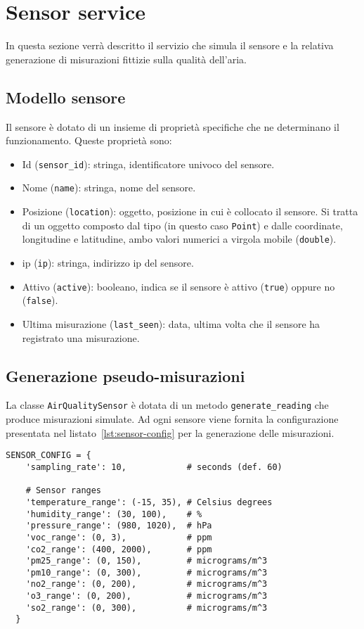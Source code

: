 \section{Sensor service}

In questa sezione verrà descritto il servizio che simula il sensore e la relativa generazione di misurazioni fittizie
sulla qualità dell'aria.

\subsection{Modello sensore}

Il sensore è dotato di un insieme di proprietà specifiche che ne determinano il funzionamento.
Queste proprietà sono:

\begin{itemize}
  \item Id (\texttt{sensor\_id}): stringa, identificatore univoco del sensore.
  \item Nome (\texttt{name}): stringa, nome del sensore.
  \item Posizione (\texttt{location}): oggetto, posizione in cui è collocato il sensore.
        Si tratta di un oggetto composto dal tipo (in questo caso \texttt{Point}) e dalle coordinate,
        longitudine e latitudine, ambo valori numerici a virgola mobile (\texttt{double}).
  \item \acrshort{ip} (\texttt{ip}): stringa, indirizzo ip del sensore.
  \item Attivo (\texttt{active}): booleano, indica se il sensore è attivo (\texttt{true})
        oppure no (\texttt{false}).
  \item Ultima misurazione (\texttt{last\_seen}): data, ultima volta che il sensore ha registrato una misurazione.
        \label{lst:sensors-properties}
\end{itemize}

\subsection{Generazione pseudo-misurazioni}

La classe \texttt{AirQualitySensor} è dotata di un metodo \texttt{generate\_reading} che produce misurazioni simulate.
Ad ogni sensore viene fornita la configurazione presentata nel listato~\ref{lst:sensor-config} per la generazione
delle misurazioni.

\begin{lstlisting}[caption={Configurazione sensore}, label=lst:sensor-config]
  SENSOR_CONFIG = {
    'sampling_rate': 10,            # seconds (def. 60)

    # Sensor ranges
    'temperature_range': (-15, 35), # Celsius degrees
    'humidity_range': (30, 100),    # %
    'pressure_range': (980, 1020),  # hPa
    'voc_range': (0, 3),            # ppm
    'co2_range': (400, 2000),       # ppm
    'pm25_range': (0, 150),         # micrograms/m^3
    'pm10_range': (0, 300),         # micrograms/m^3
    'no2_range': (0, 200),          # micrograms/m^3
    'o3_range': (0, 200),           # micrograms/m^3
    'so2_range': (0, 300),          # micrograms/m^3
  }
\end{lstlisting}

